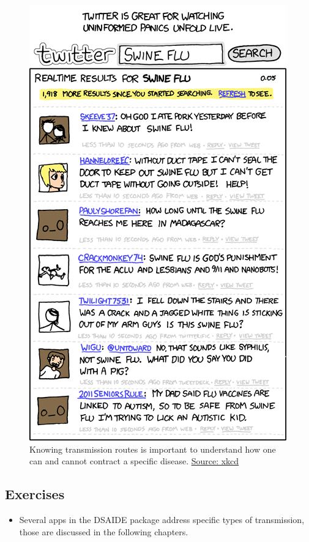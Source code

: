 \documentclass[]{article}
\providecommand{\tightlist}{%
  \setlength{\itemsep}{0pt}\setlength{\parskip}{0pt}}
\theoremstyle{definition}
\theoremstyle{definition}
\theoremstyle{definition}
\theoremstyle{remark}
\begin{document}
\begin{figure}
\centering
\includegraphics{./images/xkcd-swine_flu.png}
\caption{Knowing transmission routes is important to understand how one
can and cannot contract a specific disease.
\href{https://xkcd.com/574/}{Source: xkcd}}
\end{figure}

\subsection{Exercises}\label{exercises-4}

\begin{itemize}
\tightlist
\item
  Several apps in the DSAIDE package address specific types of
  transmission, those are discussed in the following chapters.
\end{itemize}
\end{document}
